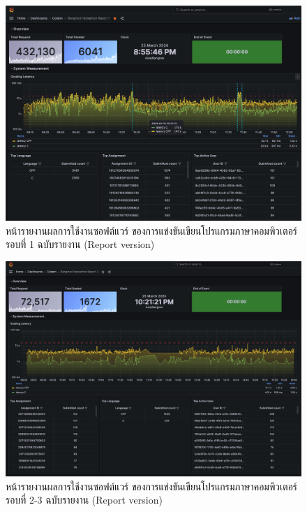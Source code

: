 \\

\begin{figure}[H]
    \centering
    \includegraphics[width=12cm]{appendices/C/figures/grafana/grafana-bmh1-report.png}
    \caption[หน้ารายงานผลการใช้งานซอฟต์แวร์ ของการแข่งขันเขียนโปรแกรมภาษาคอมพิวเตอร์รอบที่ 1 ฉบับรายงาน]{หน้ารายงานผลการใช้งานซอฟต์แวร์ ของการแข่งขันเขียนโปรแกรมภาษาคอมพิวเตอร์รอบที่ 1 ฉบับรายงาน (Report version)}
    \label{fig:res-grafana-bmh1-report}
\end{figure}

\begin{figure}[H]
    \centering
    \includegraphics[width=12cm]{appendices/C/figures/grafana/grafana-bmh2-report.png}
    \caption[หน้ารายงานผลการใช้งานซอฟต์แวร์ ของการแข่งขันเขียนโปรแกรมภาษาคอมพิวเตอร์รอบที่ 2-3 ฉบับรายงาน]{หน้ารายงานผลการใช้งานซอฟต์แวร์ ของการแข่งขันเขียนโปรแกรมภาษาคอมพิวเตอร์รอบที่ 2-3 ฉบับรายงาน (Report version)}
    \label{fig:res-grafana-bmh2-report}
\end{figure}

\pagebreak